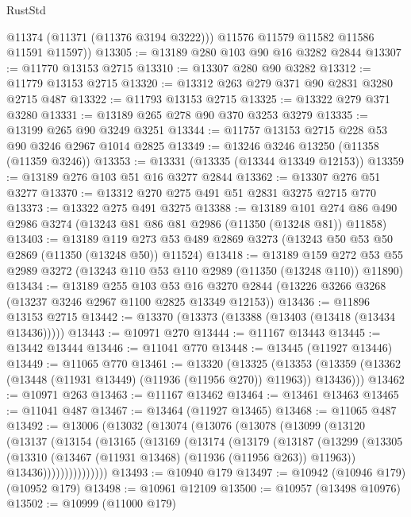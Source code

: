 \begin{lexlean}{RustStd}
\begin{coremodule}
          @11374
          (@11371 (@11376 @3194 @3222)))
        @11576
        @11579
        @11582
        @11586
        @11591
        @11597))
@13305 := @13189 @280 @103 @90 @16 @3282 @2844
@13307 := @11770 @13153 @2715
@13310 := @13307 @280 @90 @3282
@13312 := @11779 @13153 @2715
@13320 := @13312 @263 @279 @371 @90 @2831 @3280 @2715 @487
@13322 := @11793 @13153 @2715
@13325 := @13322 @279 @371 @3280
@13331 := @13189 @265 @278 @90 @370 @3253 @3279
@13335 := @13199 @265 @90 @3249 @3251
@13344 := @11757 @13153 @2715 @228 @53 @90 @3246 @2967 @1014 @2825
@13349 := @13246 @3246 @13250 (@11358 (@11359 @3246))
@13353 := @13331 (@13335 (@13344 @13349 @12153))
@13359 := @13189 @276 @103 @51 @16 @3277 @2844
@13362 := @13307 @276 @51 @3277
@13370 := @13312 @270 @275 @491 @51 @2831 @3275 @2715 @770
@13373 := @13322 @275 @491 @3275
@13388 := @13189
    @101
    @274
    @86
    @490
    @2986
    @3274
    (@13243 @81 @86 @81 @2986 (@11350 (@13248 @81)) @11858)
@13403 := @13189
    @119
    @273
    @53
    @489
    @2869
    @3273
    (@13243 @50 @53 @50 @2869 (@11350 (@13248 @50)) @11524)
@13418 := @13189
    @159
    @272
    @53
    @55
    @2989
    @3272
    (@13243 @110 @53 @110 @2989 (@11350 (@13248 @110)) @11890)
@13434 := @13189
    @255
    @103
    @53
    @16
    @3270
    @2844
    (@13226 @3266 @3268 (@13237 @3246 @2967 @1100 @2825 @13349 @12153))
@13436 := @11896 @13153 @2715
@13442 := @13370 (@13373 (@13388 (@13403 (@13418 (@13434 @13436)))))
@13443 := @10971 @270
@13444 := @11167 @13443
@13445 := @13442 @13444
@13446 := @11041 @770
@13448 := @13445 (@11927 @13446)
@13449 := @11065 @770
@13461 := @13320
    (@13325
      (@13353 (@13359 (@13362 (@13448 (@11931 @13449) (@11936 (@11956 @270)) @11963)) @13436)))
@13462 := @10971 @263
@13463 := @11167 @13462
@13464 := @13461 @13463
@13465 := @11041 @487
@13467 := @13464 (@11927 @13465)
@13468 := @11065 @487
@13492 := @13006
    (@13032
      (@13074
        (@13076
          (@13078
            (@13099
              (@13120
                (@13137
                  (@13154
                    (@13165
                      (@13169
                        (@13174
                          (@13179
                            (@13187
                              (@13299
                                (@13305
                                  (@13310 (@13467 (@11931 @13468) (@11936 (@11956 @263)) @11963))
                                  @13436)))))))))))))))
@13493 := @10940 @179
@13497 := @10942 (@10946 @179) (@10952 @179)
@13498 := @10961 @12109
@13500 := @10957 (@13498 @10976)
@13502 := @10999 (@11000 @179)

\end{coremodule}
\end{lexlean}
